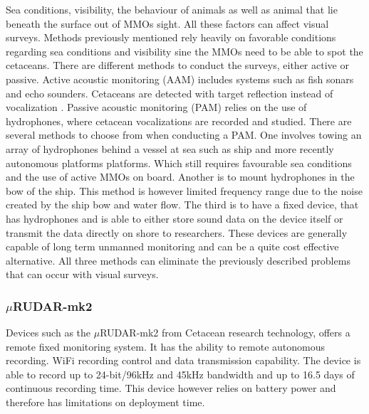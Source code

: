 Sea conditions, visibility, the behaviour of animals as well as animal that lie beneath the surface out of MMOs sight.
All these factors can affect visual surveys.
Methods previously mentioned rely heavily on favorable conditions regarding sea conditions and visibility sine the MMOs need to be able to spot the cetaceans.
There are different methods to conduct the surveys, either active or passive.
Active acoustic monitoring (AAM) includes systems such as fish sonars and echo sounders. 
Cetaceans are detected with target reflection instead of vocalization \cite{pyc_evaluation_2015}.
Passive acoustic monitoring (PAM) relies on the use of hydrophones, where cetacean vocalizations are recorded and studied.
There are several methods to choose from when conducting a PAM.
One involves towing an array of hydrophones behind a vessel at sea such as ship and more recently autonomous platforms platforms\cite{baumgartner_diel_2008}.
Which still requires favourable sea conditions and the use of active MMOs on board.
Another is to mount hydrophones in the bow of the ship.
This method is however limited frequency range due to the noise created by the ship bow and water flow\cite{rankin_acoustic_2008}.
The third is to have a fixed device, that has hydrophones and is able to either store sound data on the device itself or transmit the data directly on shore to researchers.
These devices are generally capable of long term unmanned monitoring and can be a quite cost effective alternative.
All three methods can eliminate the previously described problems that can occur with visual surveys.

\subsubsection{$\mu$RUDAR-mk2}

Devices such as the $\mu$RUDAR-mk2 from Cetacean research technology, offers a remote fixed monitoring system.
It has the ability to remote autonomous recording.
WiFi recording control and data transmission capability.
The device is able to record up to 24-bit/96kHz and 45kHz bandwidth and up to 16.5 days of continuous recording time\cite{computing_microrudar_nodate}.
This device however relies on battery power and therefore has limitations on deployment time.

